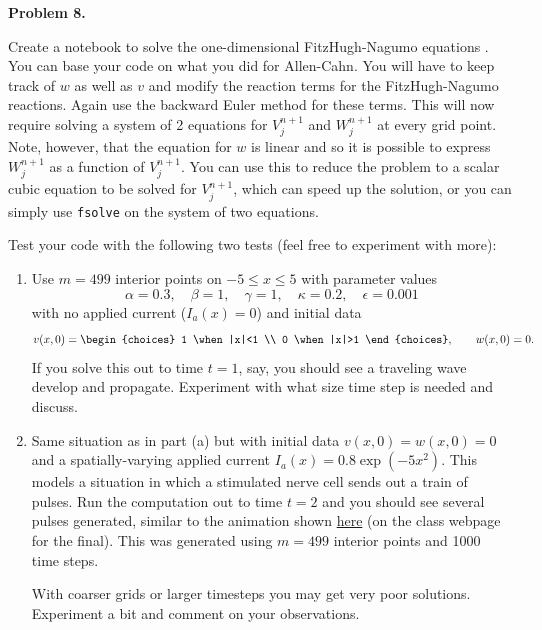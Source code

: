 \documentclass[10pt]{article}
\begin{document}
\vskip 10pt
{\large\bf Problem 8.} \vskip 10pt
\vskip 10pt

Create a notebook to solve the one-dimensional FitzHugh-Nagumo
equations . You can base your code
on what you did for Allen-Cahn.   You will have to keep track of $w$ as well as
$v$ and modify the reaction terms for the FitzHugh-Nagumo reactions.
Again use the backward Euler method for these terms.  This will now require
solving a system of 2 equations for $V_j^{n+1}$ and $W_j^{n+1}$ at every
grid point.  Note, however, that the equation for $w$ is linear and so it is
possible to express $W_j^{n+1}$ as a function of $V_j^{n+1}$.  You
can use this to reduce the problem to a scalar cubic equation to
be solved for $V_j^{n+1}$, which can speed up the solution, or you
can simply use {\tt fsolve} on the system of two equations.


Test your code with the following two tests (feel free to experiment with
more):
\begin{enumerate}
\item
Use $m=499$ interior points on $-5\leq x\leq 5$ with parameter values
\begin{equation}\label{parm2}
\alpha=0.3,\quad \beta = 1,\quad \gamma = 1,\quad \kappa=0.2,\quad \epsilon =
0.001
\end{equation}
with no applied current ($I_a(x) = 0$) and initial data
\[
v(x,0) = \begin{choices} 1 \when |x|<1 \\  0 \when |x|>1 \end{choices}, \qquad
w(x,0) = 0.
\]
If you solve this out to time $t=1$, say, you should see a traveling wave 
develop and propagate.  Experiment with what size time step is needed and
discuss.

\item
Same situation as in part (a) but with initial data $v(x,0)=w(x,0)=0$ and
a spatially-varying applied current $I_a(x) = 0.8\exp(-5x^2)$.  
This models a situation in
which a stimulated nerve cell sends out a train of pulses.  Run the
computation out to time $t=2$ and you should see several pulses generated,
similar to the animation shown
\href{http://staff.washington.edu/rjl/classes/am586s2019/_static/FNmovie.html}{here} 
(on the class webpage for the final).  
This was generated using $m=499$ interior points and 1000 time steps. 

With coarser grids or larger timesteps you may get very poor solutions.
Experiment a bit and comment on your observations.


\end{enumerate} 
\end{document}

